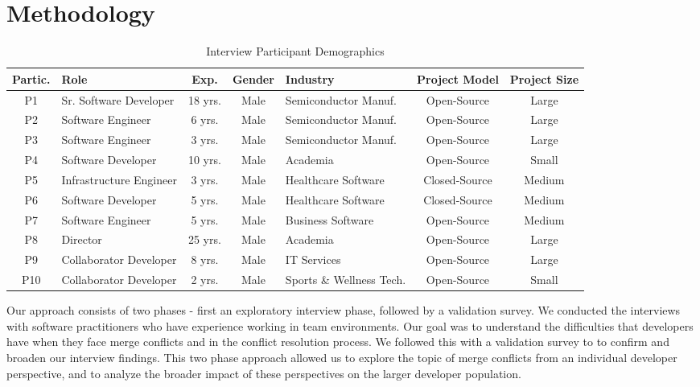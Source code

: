 \section{Methodology}\label{methodology}

\begin{table*}[!t]
\renewcommand{\arraystretch}{1.3}
\caption{Interview Participant Demographics}
\label{interview_demographics}
\centering
\begin{tabularx}{\textwidth}{@{}cl*{2}{C}l*{2}{C}}
\toprule
	\textbf{Partic.} & \textbf{Role} & \textbf{Exp.} & \textbf{Gender} & \textbf{Industry} & \textbf{Project Model} & \textbf{Project Size}\\
\midrule
	P1 & Sr. Software Developer & 18 yrs. & Male & Semiconductor Manuf. & Open-Source & Large\\
	P2 & Software Engineer & 6 yrs. & Male & Semiconductor Manuf. & Open-Source & Large\\
	P3 & Software Engineer & 3 yrs. & Male & Semiconductor Manuf. & Open-Source & Large\\
	P4 & Software Developer & 10 yrs. & Male & Academia & Open-Source & Small\\
	P5 & Infrastructure Engineer & 3 yrs. & Male & Healthcare Software & Closed-Source & Medium\\
	P6 & Software Developer & 5 yrs. & Male & Healthcare Software & Closed-Source & Medium\\
	P7 & Software Engineer & 5 yrs. & Male & Business Software & Open-Source & Medium\\
	P8 & Director & 25 yrs. & Male & Academia & Open-Source & Large\\
	P9 & Collaborator Developer & 8 yrs. & Male & IT Services & Open-Source & Large\\
	P10 & Collaborator Developer & 2 yrs. & Male & Sports \& Wellness Tech. & Open-Source & Small\\
\bottomrule
\end{tabularx}
\end{table*}

Our approach consists of two phases - first an exploratory interview phase, followed by a validation survey. We conducted the interviews with software practitioners who have experience working in team environments. Our goal was to understand the difficulties that developers have when they face merge conflicts and in the conflict resolution process. We followed this with a validation survey to to confirm and broaden our interview findings.
This two phase approach allowed us to explore the topic of merge conflicts from an individual developer perspective, and to analyze the broader impact of these perspectives on the larger developer population.

